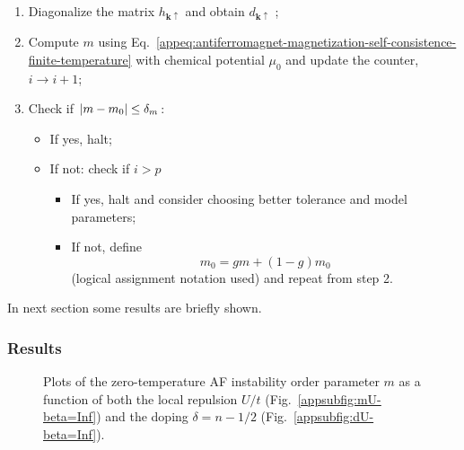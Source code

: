 \begin{enumerate}
	\item {\color{tabred}
		Diagonalize the matrix $h_{\mathbf{k}\uparrow}$ and obtain $d_{\mathbf{k}\uparrow}$
	};
	\item Compute $m$ using Eq.~\eqref{appeq:antiferromagnet-magnetization-self-consistence-finite-temperature} with chemical potential $\mu_0$ and update the counter, $i \to i+1$;
	\item Check if $\abs{m-m_0} \le \delta_m$:
	\begin{itemize}
		\item If yes, halt;
		\item If not: check if $i > p$
		\begin{itemize}
			\item If yes, halt and consider choosing better tolerance and model parameters;
			\item If not, define 
			\[
				m_0 = gm + (1-g)m_0
			\]
			(logical assignment notation used) and repeat from step 2.
		\end{itemize}
	\end{itemize}
\end{enumerate}
In next section some results are briefly shown.

\subsubsection{Results}

\begin{figure}
	\centering
	\caption{Plots of the zero-temperature AF instability order parameter $m$ as a function of both the local repulsion $U/t$ (Fig.~\ref{appsubfig:mU-beta=Inf}) and the doping $\delta = n-1/2$ (Fig.~\ref{appsubfig:dU-beta=Inf}).}
	\label{appfig:mdU-beta=Inf}
\end{figure}


